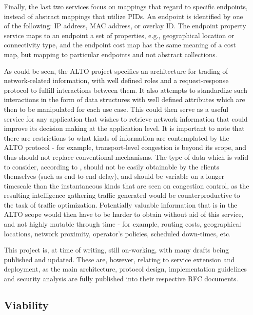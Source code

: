     Finally, the last two services focus on mappings that regard to specific endpoints, instead of abstract mappings that utilize PIDs.
    An endpoint is identified by one of the following: IP address, MAC address, or overlay ID.
    The endpoint property service maps to an endpoint a set of properties, e.g., geographical location or connectivity type, and the endpoint cost map has the same meaning of a cost map, but mapping to particular endpoints and not abstract collections.


    As could be seen, the ALTO project specifies an architecture for trading of network-related information, with well defined roles and a request-response protocol to fulfill interactions between them.
    It also attempts to standardize such interactions in the form of data structures with well defined attributes which are then to be manipulated for each use case.
    This could then serve as a useful service for any application that wishes to retrieve network information that could improve its decision making at the application level.
    It is important to note that there are restrictions to what kinds of information are contemplated by the ALTO protocol - for example, transport-level congestion is beyond its scope, and thus should not replace conventional mechanisms.
    The type of data which is valid to consider, according to \cite{alto-protocol}, should not be easily obtainable by the clients themselves (such as end-to-end delay), and should be variable on a longer timescale than the instantaneous kinds that are seen on congestion control, as the resulting intelligence gathering traffic generated would be counterproductive to the task of traffic optimization.
    Potentially valuable information that is in the ALTO scope would then have to be harder to obtain without aid of this service, and not highly mutable through time - for example, routing costs, geographical locations, network proximity, operator's policies, scheduled down-times, etc.

    This project is, at time of writing, still on-working, with many drafts being published and updated.
    These are, however, relating to service extension and deployment, as the main architecture, protocol design, implementation guidelines and security analysis are fully published into their respective RFC documents.

\subsection{Viability}

